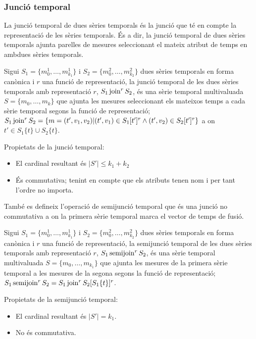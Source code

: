 \subsubsection{Junció temporal}

La junció temporal de dues sèries temporals és la junció que té en
compte la representació de les sèries temporals. És a dir, la junció
temporal de dues sèries temporals ajunta parelles de mesures
seleccionant el mateix atribut de temps en ambdues sèries temporals.


\begin{definition}\label{def:sgst:joint}
  Sigui $S_1=\{m_0^1, \dotsc, m_{k_1}^1\}$ i $S_2=\{m_0^2, \dotsc,
  m_{k_2}^2\}$ dues sèries temporals en forma canònica i $r$ una
  funció de representació, la junció temporal de les dues sèries
  temporals amb representació $r$, $S_1 \operatorname*{join}^r S_2$, és una sèrie
  temporal multivaluada $S=\{m_0, \dotsc, m_k\}$ que ajunta les
  mesures seleccionant els mateixos temps a cada sèrie temporal segons
  la funció de representació; $S_1 \operatorname*{join}^r S_2 = \{m=(t',v_1,v_2) |
  (t',v_1) \in S_1[t']^r \wedge (t',v_2) \in S_2[t']^r \}$ a on $t'\in
  S_1\{t\} \cup S_2\{t\}$.
\end{definition}


Propietats de la junció temporal:
\begin{itemize}
\item El cardinal resultant és $|S'| \leq k_1 + k_2$
\item És commutativa; tenint en compte que els atributs tenen nom i
  per tant l'ordre no importa.
\end{itemize}



També es defineix l'operació de semijunció temporal que és una junció
no commutativa a on la primera sèrie temporal marca el vector de temps
de fusió.

\begin{definition}
  Sigui $S_1=\{m_0^1, \dotsc, m_{k_1}^1\}$ i $S_2=\{m_0^2, \dotsc,
  m_{k_2}^2\}$ dues sèries temporals en forma canònica i $r$ una
  funció de representació, la semijunció temporal de les dues sèries
  temporals amb representació $r$, $S_1 \operatorname*{semijoin}^r S_2$, és una sèrie
  temporal multivaluada $S=\{m_0, \dotsc, m_{k_1}\}$ que ajunta les
  mesures de la primera sèrie temporal a les mesures de la segona
  segons la funció de representació; $S_1 \operatorname*{semijoin}^r S_2 = S_1
  \operatorname*{join}^r S_2[S_1\{t\}]^r$.
\end{definition}


Propietats de la semijunció temporal:
\begin{itemize}
\item El cardinal resultant és $|S'| = k_1$.
\item No és commutativa.
\end{itemize}

















